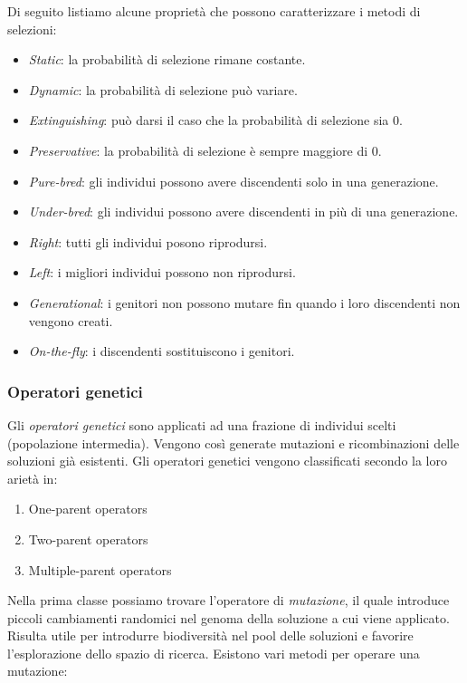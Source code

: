 \documentclass[10pt,a4paper]{article}
\begin{document}
Di seguito listiamo alcune proprietà che possono caratterizzare i metodi di selezioni:

\begin{itemize}
\item{\emph{Static}: la probabilità di selezione rimane costante.}
\item{\emph{Dynamic}: la probabilità di selezione può variare.}
\item{\emph{Extinguishing}: può darsi il caso che la probabilità di selezione sia 0.}
\item{\emph{Preservative}: la probabilità di selezione è sempre maggiore di 0.}
\item{\emph{Pure-bred}: gli individui possono avere discendenti solo in una generazione.}
\item{\emph{Under-bred}: gli individui possono avere discendenti in più di una generazione.}
\item{\emph{Right}: tutti gli individui posono riprodursi.}
\item{\emph{Left}: i migliori individui possono non riprodursi.}
\item{\emph{Generational}: i genitori non possono mutare fin quando i loro discendenti non vengono creati.}
\item{\emph{On-the-fly}: i discendenti sostituiscono i genitori.}
\end{itemize}


\subsubsection{Operatori genetici}

Gli \emph{operatori genetici} sono applicati ad una frazione di individui scelti (popolazione intermedia). Vengono così generate mutazioni e ricombinazioni delle soluzioni già esistenti. Gli operatori genetici vengono classificati secondo la loro arietà in:

\begin{enumerate}
\item{One-parent operators}
\item{Two-parent operators}
\item{Multiple-parent operators}
\end{enumerate}

Nella prima classe possiamo trovare l'operatore di \emph{mutazione}, il quale introduce piccoli cambiamenti randomici nel genoma della soluzione a cui viene applicato. Risulta utile per introdurre biodiversità nel pool delle soluzioni e favorire l'esplorazione dello spazio di ricerca. Esistono vari metodi per operare una mutazione:
\end{document}
